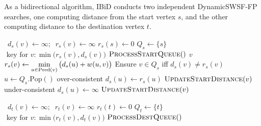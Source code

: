 {
\begin{algorithm}[t]
   \caption{As a bidirectional algorithm,
      IBiD conducts two independent DynamicSWSF-FP searches,
      one computing distance from the start vertex $s$,
      and the other computing distance to the destination vertex $t$.}
   \label{alg:ibid-two-dynamicswsffps}
   \begin{minipage}[t]{8.2cm}
      \begin{algorithmic}[1]
          {\,\!}
               \State $d_s(v) \gets \infty; \;\; r_s(v) \gets \infty$
            \EndFor
            \State $r_s(s) \gets 0$
            \State $Q_s \gets \{ s \}$
               \Comment $\mbox{ key for } v: \min\big(r_s(v),d_s(v)\big)$
            \State $\mbox{\sc ProcessStartQueue}()$
         \EndProcedure
          {$v$}
               \State $r_s(v) \gets \displaystyle\min_{u \in \mbox{\scriptsize Pred}(v)}
                  \big( d_s(u) + w(u,v) \big)$
            \EndIf
            \State Ensure $v \in Q_s$ iff $d_s(v) \neq r_s(v)$
         \EndProcedure
          {\,\!}
            \State $u \gets Q_s.\mbox{Pop}()$
                  \Comment over-consistent
               \State $d_s(u) \gets r_s(u)$
                  \State $\mbox{\sc UpdateStartDistance}(v)$
               \EndFor
            \Else
                  \Comment under-consistent
               \State $d_s(u) \gets \infty$
                  \State $\mbox{\sc UpdateStartDistance}(v)$
               \EndFor
            \EndIf
         \EndProcedure
      \end{algorithmic}
   \end{minipage}
   \quad
   \begin{minipage}[t]{8.2cm}
      \begin{algorithmic}[1]
          {\,\!}
               \State $d_t(v) \gets \infty; \;\; r_t(v) \gets \infty$
            \EndFor
            \State $r_t(t) \gets 0$
            \State $Q_t \gets \{ t \}$
               \Comment $\mbox{ key for } v: \min\big(r_t(v),d_t(v)\big)$
            \State $\mbox{\sc ProcessDestQueue}()$
         \EndProcedure

\end{algorithmic}
\end{minipage}
\end{algorithm}}
